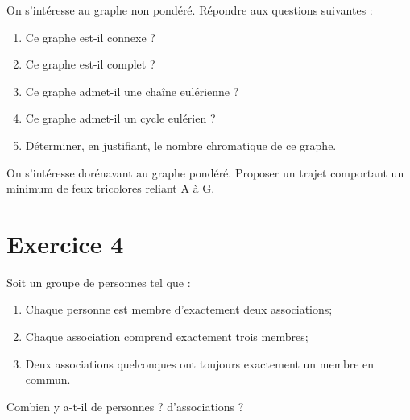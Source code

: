 \documentclass[10pt,a4paper]{article}
\begin{document}
 On s'intéresse au graphe non pondéré. Répondre aux questions suivantes :
\begin{enumerate}
    \item Ce graphe est-il connexe ?
    \item Ce graphe est-il complet ?
    \item Ce graphe admet-il une chaîne eulérienne ?
    \item Ce graphe admet-il un cycle eulérien ?
    \item Déterminer, en justifiant, le nombre chromatique de ce graphe.
\end{enumerate}
On s'intéresse dorénavant au graphe pondéré. Proposer un trajet comportant un minimum de feux tricolores reliant A à G.




\section*{Exercice 4}
Soit un groupe de personnes tel que :
\begin{enumerate}
    \item Chaque personne est membre d’exactement deux associations;
    \item Chaque association comprend exactement trois membres;
    \item Deux associations quelconques ont toujours exactement un membre en commun.
\end{enumerate}
Combien y a-t-il de personnes ? d’associations ?
\end{document}
